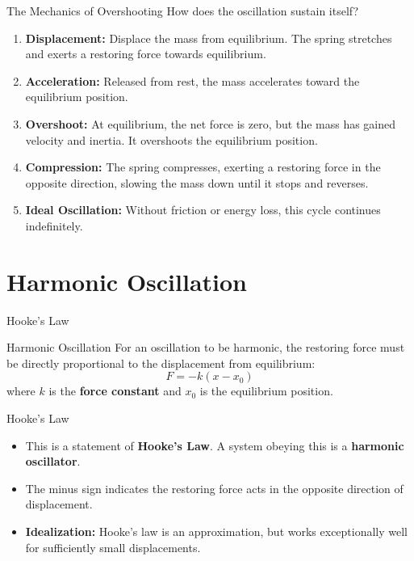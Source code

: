 \documentclass[aspectratio=169,xcolor=dvipsnames]{beamer}
\begin{document}
\begin{frame}{The Mechanics of Overshooting}
  How does the oscillation sustain itself?
  \begin{enumerate}
    \item \textbf{Displacement:} Displace the mass from equilibrium. The spring stretches and exerts a restoring force towards equilibrium.
    \item \textbf{Acceleration:} Released from rest, the mass accelerates toward the equilibrium position.
    \item \textbf{Overshoot:} At equilibrium, the net force is zero, but the mass has gained velocity and inertia. It overshoots the equilibrium position.
    \item \textbf{Compression:} The spring compresses, exerting a restoring force in the opposite direction, slowing the mass down until it stops and reverses.
    \item \textbf{Ideal Oscillation:} Without friction or energy loss, this cycle continues indefinitely.
  \end{enumerate}
\end{frame}

\section{Harmonic Oscillation}

\begin{frame}{Hooke's Law}
  \begin{umdefinition}{Harmonic Oscillation}
    For an oscillation to be harmonic, the restoring force must be directly proportional to the displacement from equilibrium:
    \begin{equation}
      F = -k(x - x_0)
    \end{equation}
    where $k$ is the \textbf{force constant} and $x_0$ is the equilibrium position.
  \end{umdefinition}
\end{frame}

\begin{frame}{Hooke's Law}
  \begin{itemize}
    \item This is a statement of \textbf{Hooke's Law}. A system obeying this is a \textbf{harmonic oscillator}.
    \item The minus sign indicates the restoring force acts in the opposite direction of displacement.
    \item \textbf{Idealization:} Hooke's law is an approximation, but works exceptionally well for sufficiently small displacements.
  \end{itemize}
\end{frame}
\end{document}
